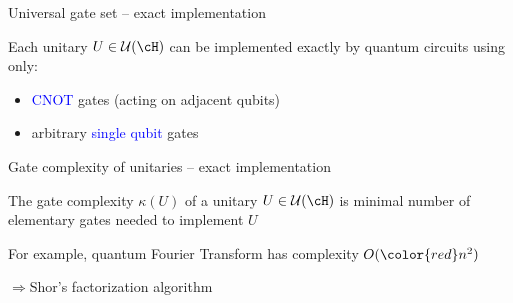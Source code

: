 


\begin{frame}{Universal gate set -- exact implementation}

Each unitary $U\in {\cal U}(\cH)$ can be
implemented exactly by quantum circuits using only:

\medskip
\begin{itemize}
\item \textcolor{blue}{CNOT} gates (acting on adjacent qubits)

\bigskip
\item arbitrary \textcolor{blue}{single qubit} gates
\end{itemize}

\end{frame}




\begin{frame}{Gate complexity of unitaries -- exact implementation}

The gate complexity $\kappa(U)$ of a unitary $U\in {\cal U}(\cH)$ is minimal number of elementary gates needed to implement $U$

\bigskip

\bigskip
For example, quantum Fourier Transform has complexity $O({\color{red} n^2})$ 

\medskip
\quad $\Longrightarrow$\quad Shor's factorization algorithm

\end{frame}




